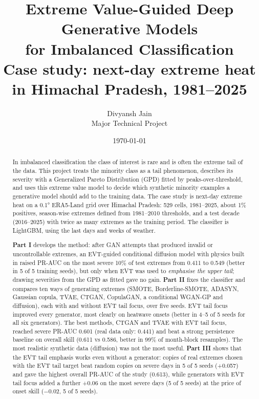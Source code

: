 \documentclass[11pt,a4paper]{article}
\title{\textbf{Extreme Value-Guided Deep Generative Models\\for Imbalanced Classification}\\[4pt]
\large Case study: next-day extreme heat in Himachal Pradesh, 1981--2025}
\author{Divyansh Jain\\Major Technical Project}
\date{\today}
\begin{document}
\maketitle

\begin{abstract}
In imbalanced classification the class of interest is rare and is often the extreme tail of the data.
This project treats the minority class as a tail phenomenon, describes its severity with a Generalized
Pareto Distribution (GPD) fitted by peaks-over-threshold, and uses this extreme value model to decide
which synthetic minority examples a generative model should add to the training data. The case study is
next-day extreme heat on a \ang{0.1} ERA5-Land grid over Himachal Pradesh: 529 cells, 1981--2025, about
1\% positives, season-wise extremes defined from 1981--2010 thresholds, and a test decade (2016--2025)
with twice as many extremes as the training period. The classifier is LightGBM, using the last days and
weeks of weather.

\textbf{Part I} develops the method: after GAN attempts that produced invalid or uncontrollable extremes,
an EVT-guided conditional diffusion model with physics built in raised PR-AUC on the most severe 10\% of
test extremes from 0.411 to 0.549 (better in 5 of 5 training seeds), but only when EVT was used to
\emph{emphasise the upper tail}; drawing severities from the GPD as fitted gave no gain.
\textbf{Part II} fixes the classifier and compares ten ways of generating extremes (SMOTE, Borderline-SMOTE,
ADASYN, Gaussian copula, TVAE, CTGAN, CopulaGAN, a conditional WGAN-GP and diffusion), each with and
without EVT tail focus, over five seeds. EVT tail focus improved every generator, most clearly on
heatwave onsets (better in 4--5 of 5 seeds for all six generators). The best methods, CTGAN and TVAE with
EVT tail focus, reached severe PR-AUC 0.601 (real data only: 0.441) and beat a strong persistence
baseline on overall skill (0.611 vs 0.586, better in 99\% of month-block resamples). The most realistic
synthetic data (diffusion) was not the most useful. \textbf{Part III} shows that the EVT tail emphasis works
even without a generator: copies of real extremes chosen with the EVT tail target beat random copies on severe
days in 5 of 5 seeds (+0.057) and gave the highest overall PR-AUC of the study (0.613), while generators with
EVT tail focus added a further +0.06 on the most severe days (5 of 5 seeds) at the price of onset skill
($-0.02$, 5 of 5 seeds).
\end{abstract}
\end{document}
